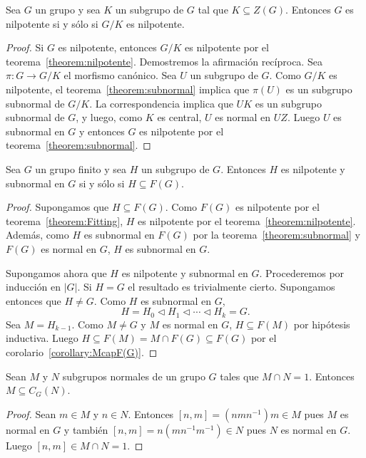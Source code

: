 \begin{corollary}
	Sea $G$ un grupo y sea $K$ un subgrupo de $G$ tal que $K\subseteq Z(G)$.
	Entonces $G$ es nilpotente si y sólo si $G/K$ es nilpotente. 
\end{corollary}

\begin{proof}
	Si $G$ es nilpotente, entonces $G/K$ es nilpotente por el
	teorema~\ref{theorem:nilpotente}. Demostremos la afirmación recíproca. Sea
	$\pi\colon G\to G/K$ el morfismo canónico. Sea $U$ un subgrupo de $G$. Como
	$G/K$ es nilpotente, el teorema~\ref{theorem:subnormal} implica que
	$\pi(U)$ es un subgrupo subnormal de $G/K$. La correspondencia implica que
	$UK$ es un subgrupo subnormal de $G$, y luego, como $K$ es central, $U$ es
	normal en $UZ$. Luego $U$ es subnormal en $G$ y entonces $G$ es nilpotente
	por el teorema~\ref{theorem:subnormal}.
\end{proof}

\begin{theorem}
	\label{theorem:F(G)subnormalidad}
	Sea $G$ un grupo finito y sea $H$ un subgrupo de $G$. Entonces $H$ es
	nilpotente y subnormal en $G$ si y sólo si $H\subseteq F(G)$.
\end{theorem}

\begin{proof}
	Supongamos que $H\subseteq F(G)$. Como $F(G)$ es nilpotente por el
	teorema~\ref{theorem:Fitting}, $H$ es nilpotente por el
	teorema~\ref{theorem:nilpotente}. Además, como $H$ es subnormal en $F(G)$ por la
	teorema~\ref{theorem:subnormal} y $F(G)$ es normal en $G$, $H$ es
	subnormal en $G$.

	Supongamos ahora que $H$ es nilpotente y subnormal en $G$.  Procederemos
	por inducción en $|G|$. Si $H=G$ el resultado es trivialmente cierto.
	Supongamos entonces que $H\ne G$. Como $H$ es subnormal en $G$, 
	\[
		H=H_0\triangleleft H_1\triangleleft\cdots\triangleleft H_k=G.
	\]
	Sea $M=H_{k-1}$. Como $M\ne G$ y $M$ es normal en $G$, 
	$H\subseteq F(M)$ por hipótesis	inductiva. Luego $H\subseteq F(M)=M\cap
	F(G)\subseteq F(G)$ por el corolario~\ref{corollary:McapF(G)}.
\end{proof}

\begin{lemma}
	\label{lemma:McapN=1}
	Sean $M$ y $N$ subgrupos normales de un grupo $G$ tales que $M\cap N=1$.
	Entonces $M\subseteq C_G(N)$.
\end{lemma}

\begin{proof}
	Sean $m\in M$ y $n\in N$. Entonces $[n,m]=(nmn^{-1})m\in M$ pues $M$ es
	normal en $G$ y también $[n,m]=n(mn^{-1}m^{-1})\in N$ pues $N$ es normal en
	$G$. Luego $[n,m]\in M\cap N=1$.
\end{proof}

